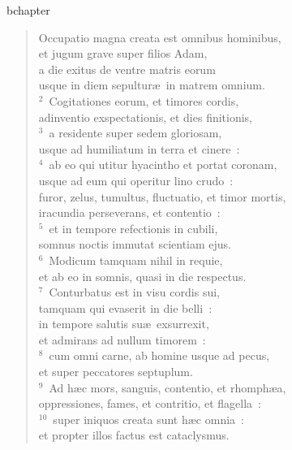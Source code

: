 bchapter\begin{verse}\vspace{-19pt}Occupatio magna creata est omnibus hominibus,\\ et jugum grave super filios Adam,\\ a die exitus de ventre matris eorum\\ usque in diem sepultur\ae\ in matrem omnium.\\
${}^{2}$~Cogitationes eorum, et timores cordis,\\ adinventio exspectationis, et dies finitionis,\\
${}^{3}$~a residente super sedem gloriosam,\\ usque ad humiliatum in terra et cinere~:\\
${}^{4}$~ab eo qui utitur hyacintho et portat coronam,\\ usque ad eum qui operitur lino crudo~:\\ furor, zelus, tumultus, fluctuatio, et timor mortis,\\ iracundia perseverans, et contentio~:\\
${}^{5}$~et in tempore refectionis in cubili,\\ somnus noctis immutat scientiam ejus.\\
${}^{6}$~Modicum tamquam nihil in requie,\\ et ab eo in somnis, quasi in die respectus.\\
${}^{7}$~Conturbatus est in visu cordis sui,\\ tamquam qui evaserit in die belli~:\\ in tempore salutis su\ae\ exsurrexit,\\ et admirans ad nullum timorem~:\\
${}^{8}$~cum omni carne, ab homine usque ad pecus,\\ et super peccatores septuplum.\\
${}^{9}$~Ad h\ae c mors, sanguis, contentio, et rhomph\ae a,\\ oppressiones, fames, et contritio, et flagella~:\\
${}^{10}$~super iniquos creata sunt h\ae c omnia~:\\ et propter illos factus est cataclysmus.\end{verse}


